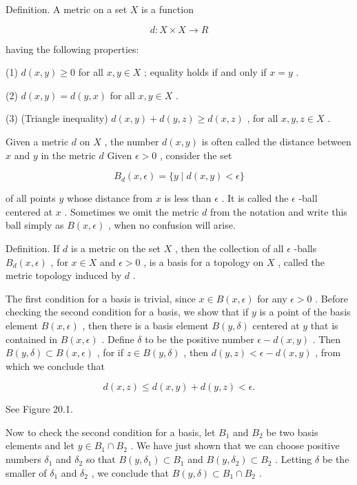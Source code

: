 Definition. A metric on a set \(X\) is a function

\[
d : X \times  X \rightarrow  R
\]

having the following properties:

(1) \(d\left( {x,y}\right)  \geq  0\) for all \(x,y \in  X\) ; equality holds if and only if \(x = y\) .

(2) \(d\left( {x,y}\right)  = d\left( {y,x}\right)\) for all \(x,y \in  X\) .

(3) (Triangle inequality) \(d\left( {x,y}\right)  + d\left( {y,z}\right)  \geq  d\left( {x,z}\right)\) , for all \(x,y,z \in  X\) .

Given a metric \(d\) on \(X\) , the number \(d\left( {x,y}\right)\) is often called the distance between \(x\) and \(y\) in the metric \(d\) Given \(\epsilon  > 0\) , consider the set

\[
{B}_{d}\left( {x,\epsilon }\right)  = \{ y \mid  d\left( {x,y}\right)  < \epsilon \}
\]

of all points \(y\) whose distance from \(x\) is less than \(\epsilon\) . It is called the \(\epsilon\) -ball centered at \(x\) . Sometimes we omit the metric \(d\) from the notation and write this ball simply as \(B\left( {x,\epsilon }\right)\) , when no confusion will arise.

Definition. If \(d\) is a metric on the set \(X\) , then the collection of all \(\epsilon\) -balls \({B}_{d}\left( {x,\epsilon }\right)\) , for \(x \in  X\) and \(\epsilon  > 0\) , is a basis for a topology on \(X\) , called the metric topology induced by \(d\) .

The first condition for a basis is trivial, since \(x \in  B\left( {x,\epsilon }\right)\) for any \(\epsilon  > 0\) . Before checking the second condition for a basis, we show that if \(y\) is a point of the basis element \(B\left( {x,\epsilon }\right)\) , then there is a basis element \(B\left( {y,\delta }\right)\) centered at \(y\) that is contained in \(B\left( {x,\epsilon }\right)\) . Define \(\delta\) to be the positive number \(\epsilon  - d\left( {x,y}\right)\) . Then \(B\left( {y,\delta }\right)  \subset  B\left( {x,\epsilon }\right)\) , for if \(z \in  B\left( {y,\delta }\right)\) , then \(d\left( {y,z}\right)  < \epsilon  - d\left( {x,y}\right)\) , from which we conclude that

\[
d\left( {x,z}\right)  \leq  d\left( {x,y}\right)  + d\left( {y,z}\right)  < \epsilon .
\]

See Figure 20.1.

Now to check the second condition for a basis, let \({B}_{1}\) and \({B}_{2}\) be two basis elements and let \(y \in  {B}_{1} \cap  {B}_{2}\) . We have just shown that we can choose positive numbers \({\delta }_{1}\) and \({\delta }_{2}\) so that \(B\left( {y,{\delta }_{1}}\right)  \subset  {B}_{1}\) and \(B\left( {y,{\delta }_{2}}\right)  \subset  {B}_{2}\) . Letting \(\delta\) be the smaller of \({\delta }_{1}\) and \({\delta }_{2}\) , we conclude that \(B\left( {y,\delta }\right)  \subset  {B}_{1} \cap  {B}_{2}\) .

